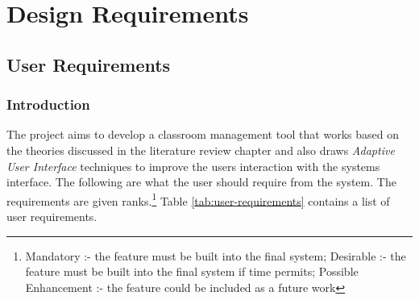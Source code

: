 \section{Design Requirements}
\subsection{User Requirements} \label{sub:userRequirments}
\subsubsection{Introduction}
The project aims to develop a classroom management tool that works based on the theories discussed in the literature review chapter and also draws \emph{Adaptive User Interface} techniques to improve the users interaction with the systems interface. The following are what the user should require from the system. The requirements are given ranks.\footnote{ Mandatory :- the feature must be built into the final system; Desirable :- the feature must be built into the final system if time permits; Possible Enhancement :- the feature could be included as a future work} Table \ref{tab:user-requirements} contains a list of user requirements.






